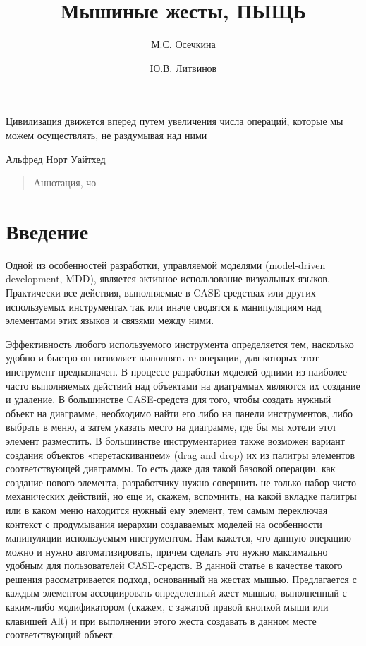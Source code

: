 \documentclass[a5paper]{article}
\title{Мышиные жесты, ПЫЩЬ}
\author{М.С. Осечкина \and Ю.В. Литвинов}
\date{}
\begin{document}
\maketitle
\thispagestyle{empty}

\epigraph{Цивилизация движется вперед путем увеличения числа операций, которые мы можем осуществлять, не раздумывая над ними}%
         {Альфред Норт Уайтхед}

\begin{quote}
\small\noindent
Аннотация, чо
\end{quote}

\section*{Введение}
Одной из особенностей разработки, управляемой моделями (model-driven development, MDD), является активное использование 
визуальных языков. Практически все действия, выполняемые в CASE-средствах или других используемых инструментах так или 
иначе сводятся к манипуляциям над элементами этих языков и связями между ними. 

Эффективность любого используемого инструмента определяется тем, насколько удобно и быстро он позволяет выполнять те операции, 
для которых этот инструмент предназначен. В процессе разработки моделей одними из наиболее часто выполняемых действий над объектами 
на диаграммах являются их создание и удаление.  В большинстве CASE-средств для того, чтобы создать нужный объект на диаграмме, 
необходимо найти его либо на панели инструментов, либо выбрать в меню, а затем указать место на диаграмме, где бы мы хотели этот 
элемент разместить. В большинстве инструментариев также возможен вариант создания объектов «перетаскиванием» (drag and drop) их из 
палитры элементов соответствующей диаграммы. То есть даже для такой базовой операции, как создание нового элемента, разработчику нужно 
совершить не только набор чисто механических действий, но еще и, скажем, вспомнить, на какой вкладке палитры или в каком меню находится 
нужный ему элемент, тем самым переключая контекст с продумывания иерархии создаваемых моделей на особенности манипуляции 
используемым инструментом. Нам кажется, что данную операцию можно и нужно автоматизировать, причем сделать это нужно максимально удобным для 
пользователей CASE-средств. В данной статье в качестве такого решения рассматривается подход, основанный на жестах мышью. 
Предлагается с каждым элементом ассоциировать определенный жест мышью, выполненный с каким-либо модификатором (скажем, с зажатой 
правой кнопкой мыши или клавишей Alt) и при выполнении этого жеста создавать в данном месте соответствующий объект. 
\end{document}
